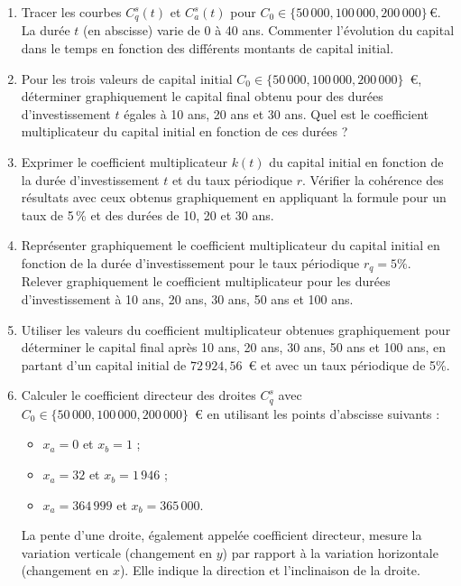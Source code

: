 \documentclass{article}
\begin{document}
\begin{enumerate}[label=\textbf{Q\arabic*.}]
    \item Tracer les courbes \( C^s_q(t) \) et \( C^s_a(t) \) pour \( C_0 \in \{50\,000, 100\,000, 200\,000\} \, \text{€} \). La durée \( t \) (en abscisse) varie de 0 à 40 ans. Commenter l'évolution du capital dans le temps en fonction des différents montants de capital initial.

    \item Pour les trois valeurs de capital initial \( C_0 \in \{50\,000, 100\,000, 200\,000\} \)~€, déterminer graphiquement le capital final obtenu pour des durées d'investissement \( t \) égales à 10 ans, 20 ans et 30 ans. Quel est le coefficient multiplicateur du capital initial en fonction de ces durées ?

    \item Exprimer le coefficient multiplicateur \( k(t) \) du capital initial en fonction de la durée d'investissement \( t \) et du taux périodique \( r \). Vérifier la cohérence des résultats avec ceux obtenus graphiquement en appliquant la formule pour un taux de 5\,\% et des durées de 10, 20 et 30 ans.

    \item Représenter graphiquement le coefficient multiplicateur du capital initial en fonction de la durée d'investissement pour le taux périodique $r_q = 5\%$. Relever graphiquement le coefficient multiplicateur pour les durées d'investissement à 10 ans, 20 ans, 30 ans, 50 ans et 100 ans.

    \item Utiliser les valeurs du coefficient multiplicateur obtenues graphiquement pour déterminer le capital final après 10 ans, 20 ans, 30 ans, 50 ans et 100 ans, en partant d'un capital initial de $72\,924,56$\ € et avec un taux périodique de 5\%.

    \item Calculer le coefficient directeur des droites \( C^s_q \) avec \( C_0 \in \{50\,000, 100\,000, 200\,000\} \)~€ en utilisant les points d'abscisse suivants :
    \begin{itemize}
        \item \( x_a = 0 \) et \( x_b = 1 \) ;
        \item \( x_a = 32 \) et \( x_b = 1\,946 \) ;
        \item \( x_a = 364\,999 \) et \( x_b = 365\,000 \).
    \end{itemize}
    \begin{tcolorbox}[
        colback=lightgreen,
        colframe=lightgreen,
        boxrule=0.5pt,
        arc=0pt,
        left=10pt,
        right=10pt,
        top=6pt,
        bottom=6pt,
        boxsep=2pt,
        before upper={\faLightbulb\hspace{10pt}}
    ]
        La pente d'une droite, également appelée coefficient directeur, mesure la variation verticale (changement en \( y \)) par rapport à la variation horizontale (changement en \( x \)). Elle indique la direction et l'inclinaison de la droite.
    

\end{tcolorbox}
\end{enumerate}
\end{document}

